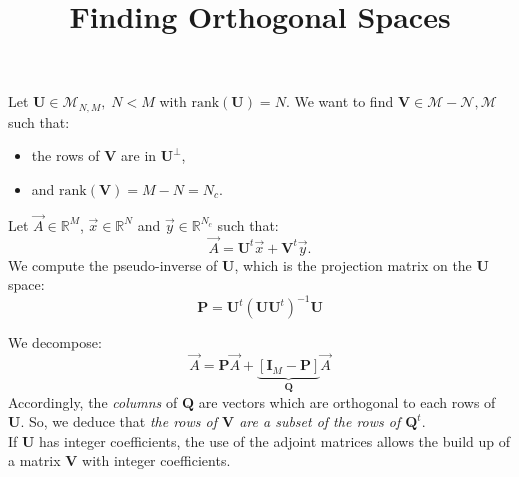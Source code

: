 \documentclass[aps,onecolumn,11pt]{revtex4}
\newcommand{\rank}{\mathrm{rank}}
\begin{document}
\title{\Large Finding Orthogonal Spaces}
\maketitle

Let $\bm{U}\in\mathcal{M}_{N,M}, \; N<M$ with $\rank(\bm{U})=N$.
We want to find $\bm{V}\in\mathcal{M-N,M}$ such that:
\begin{itemize}
\item the rows of
$\bm{V}$ are in $\bm{U}^\perp$,
\item and $\rank(\bm{V})=M-N=N_c$.
\end{itemize}

Let $\vec{A}\in\mathbb{R}^M$, $\vec{x}\in\mathbb{R}^N$ and $\vec{y}\in\mathbb{R}^{N_c}$ such that:
\begin{equation}
	\vec{A} = \bm{U}^t \vec{x} + \bm{V}^t \vec{y}.
\end{equation}
We compute the pseudo-inverse of $\bm{U}$, which is the projection matrix on the $\bm{U}$ space:
\begin{equation}
	\bm{P} = \bm{U}^t \left(\bm{U}\bm{U}^t\right)^{-1} \bm{U}
\end{equation}

We decompose:
\begin{equation}
	\vec{A} = \bm{P} \vec{A} + \underbrace{\left[\bm{I}_M - \bm{P} \right]}_{\bm{Q}} \vec{A}
\end{equation}
Accordingly, the \textit{columns} of $\bm{Q}$ are vectors which are orthogonal to each rows of $\bm{U}$.
So, we deduce that \textit{the rows of $\bm{V}$ are a subset of the rows of $\bm{Q}^t$}.
\\
If $\bm{U}$ has integer coefficients, the use of the adjoint matrices allows the build up of
a matrix $\bm{V}$ with integer coefficients.
\end{document}
